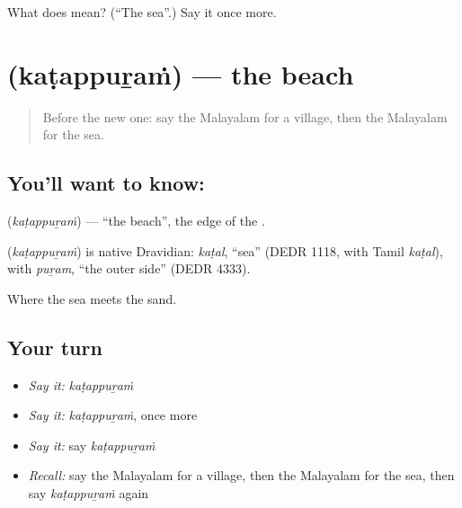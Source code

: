 \begin{tcolorbox}[breakable,colback=teal!4,colframe=teal!35!black,title={Before you move on}]
What does  mean? (\textquotedblleft{}The sea\textquotedblright{}.) Say it once more.
\end{tcolorbox}
\section[\texorpdfstring{\ml{കടപ്പുറം} (kaṭappuṟaṁ)}{കടപ്പുറം (kaṭappuṟaṁ)}]{ (kaṭappuṟaṁ) — the beach}

\label{lesson:ML-C136-beach}



\begin{quote}
Before the new one: say the Malayalam for a village, then the Malayalam for the sea.
\end{quote}

\subsection*{You'll want to know: }
\textbf{} (\emph{kaṭappuṟaṁ}) — \textquotedblleft{}the beach\textquotedblright{}, the edge of the \textbf{}.

\begin{cousinweb}
\textbf{} (\emph{kaṭappuṟaṁ}) is native Dravidian: \emph{kaṭal}, \textquotedblleft{}sea\textquotedblright{} (DEDR 1118, with Tamil \emph{kaṭal}), with \emph{puṟam}, \textquotedblleft{}the outer side\textquotedblright{} (DEDR 4333).
\end{cousinweb}

\begin{grammarlens}[title={What you've built}]
Where the sea meets the sand.
\end{grammarlens}

\subsection*{Your turn}
\begin{itemize}
\raggedright
  \item \emph{Say it:} \emph{kaṭappuṟaṁ}
  \item \emph{Say it:} \emph{kaṭappuṟaṁ}, once more
  \item \emph{Say it:} say \emph{kaṭappuṟaṁ}
  \item \emph{Recall:} say the Malayalam for a village, then the Malayalam for the sea, then say \emph{kaṭappuṟaṁ} again
\end{itemize}

